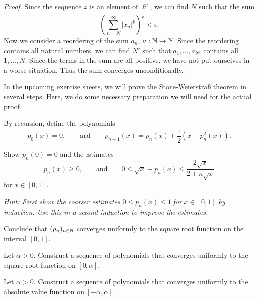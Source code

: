 \begin{proof}
	Since the sequence $x$ is an element of $\ell^p$, we can find $N$ such that the sum
	\[(\sum_{n=N}^\infty |x_n|^p)^{\frac{1}{p}}<\epsilon.\]
	Now we consider a reordering of the sum $a_n$, $a: \mathbb{N}\to \mathbb{N}$. Since the reordering contains all natural numbers, we can find $N'$ such that $a_1, \dots, a_{N'}$ contains all $1, \dots, N$. Since the terms in the sum are all positive, we have not put ourselves in a worse situation. Thus the sum converges unconditionally.
\end{proof}
\begin{Problem}
	In the upcoming exercise sheets, we will prove the Stone-Weierstraß theorem in several steps. Here, we do some necessary preparation we will need for the actual proof.

	By recursion, define the polynomials
	\[
	p_0(x)=0,\qquad\text{and}\qquad p_{n+1}(x)=p_n(x)+\frac{1}{2}(x-p_n^2(x))
	.\] 
	\begin{parts}
	\item Show $p_n(0)=0$ and the estimates
		\[
		p_n(x)\ge 0,\qquad \text{and}\qquad 0\le \sqrt{x} -p_n(x)\le \frac{2\sqrt{x} }{2+n\sqrt{x} }
		\]
		for $x\in [0,1]$.

		\emph{Hint: First show the coarser estimates} $0\le p_n(x)\le 1$ \emph{ for }$x\in [0,1]$ \emph{by induction. Use this in a second induction to improve the estimates.}
	\item Conclude that $(p_n)_{n\in \mathbb{N}}$ converges uniformly to the square root function on the interval $[0,1]$.
	\item Let $\alpha>0$. Construct a sequence of polynomials that converges uniformly to the square root function on $[0,\alpha]$.
	\item Let $\alpha>0$. Construct a sequence of polynomials that converges uniformly to the absolute value function on $[-\alpha, \alpha]$.
	\end{parts}
\end{Problem}
